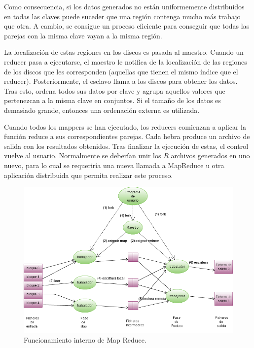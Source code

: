 \documentclass[10pt]{article}
\begin{document}
		Como consecuencia, si los datos generados no están uniformemente distribuidos en todas las claves puede suceder que una región contenga mucho más trabajo que otra. A cambio, se consigue un proceso eficiente para conseguir que todas las parejas con la misma clave vayan a la misma región.
		
		La localización de estas regiones en los discos es pasada al maestro. Cuando un reducer pasa a ejecutarse, el maestro le notifica de la localización de las regiones de los discos que les corresponden (aquellas que tienen el mismo índice que el reducer). Posteriormente, el esclavo llama a los discos para obtener los datos. Tras esto, ordena todos sus datos por clave y agrupa aquellos valores que pertenezcan a la misma clave en conjuntos. Si el tamaño de los datos es demasiado grande, entonces una ordenación externa es utilizada.
		
		Cuando todos los mappers se han ejecutado, los reducers comienzan a aplicar la función reduce a sus correspondientes parejas. Cada hebra produce un archivo de salida con los resultados obtenidos. Tras finalizar la ejecución de estas, el control vuelve al usuario. Normalmente se deberían unir los $R$ archivos generados en uno nuevo, para lo cual se requeriría una nueva llamada a MapReduce u otra aplicación distribuida que permita realizar este proceso.

		\begin{figure}[H]
			\centering
			\includegraphics[width=14cm]{./images/MapReduce-MasterWorkers.png}
			\caption{Funcionamiento interno de Map Reduce.} 
			\label{fig:map-reduce:master-workers}
		\end{figure}
\end{document}
